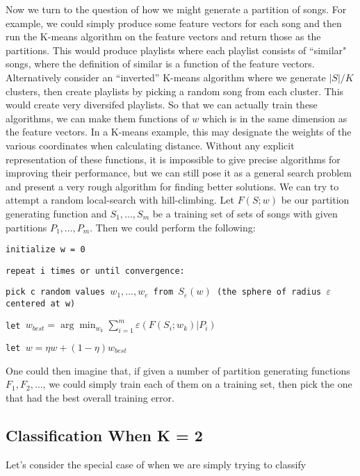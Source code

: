 \documentclass[12pt]{article}
\begin{document}
Now we turn to the question of how we might generate a partition of songs. For example, we could simply produce some feature vectors for each song and then run the K-means algorithm on the feature vectors and return those as the partitions. This would produce playlists where each playlist consists of ``similar" songs, where the definition of similar is a function of the feature vectors. Alternatively consider an ``inverted'' K-means algorithm where we generate $|S| / K$ clusters, then create playlists by picking a random song from each cluster. This would create very diversifed playlists. So that we can actually train these algorithms, we can make them functions of $w$ which is in the same dimension as the feature vectors. In a K-means example, this may designate the weights of the various coordinates when calculating distance. Without any explicit representation of these functions, it is impossible to give precise algorithms for improving their performance, but we can still pose it as a general search problem and present a very rough algorithm for finding better solutions. We can try to attempt a random local-search with hill-climbing. Let $F(S; w)$ be our partition generating function and $S_1, \ldots, S_m$ be a training set of sets of songs with given partitions $P_1, \ldots, P_m$. Then we could perform the following:

\texttt{initialize w = 0}

\texttt{repeat i times or until convergence:}

\texttt{\qquad pick c random values $w_1, \ldots, w_c$ from $S_\varepsilon(w)$ (the sphere of radius $\varepsilon$ centered at w)}

\texttt{\qquad let $w_{best} = \arg \min_{w_k} \sum_{i=1}^m \varepsilon(F(S_i; w_k) | P_i)$}

\texttt{\qquad let $w = \eta w + (1 - \eta) w_{best}$ }

One could then imagine that, if given a number of partition generating functions $F_1, F_2, \ldots$, we could simply train each of them on a training set, then pick the one that had the best overall training error.

\subsection*{Classification When K = 2}

Let's consider the special case of when we are simply trying to classify 
\end{document}
